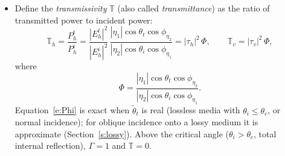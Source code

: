 \documentclass[11pt, oneside]{article}
\begin{document}
\begin{itemize}
\begin{equation}
	\end{equation}
	Similarly,
	\begin{equation}
		\boxed{\Gamma_v = |\rho_v|^2}
	\end{equation}
	\item Define the \emph{transmissivity} $\mathbb{T}$ (also called \emph{transmittance}) as the ratio of transmitted power to incident power:
	\begin{equation}
		\mathbb{T}_h = \frac{P_h^t}{P_h^i} = \frac{|E_h^t|^2}{|E_h^i|^2}\,\frac{|\eta_1|\cos\theta_t\cos\phi_{\eta_2}}{|\eta_2|\cos\theta_i\cos\phi_{\eta_1}} = |\tau_h|^2\,\Phi,
		\qquad
		\mathbb{T}_v = |\tau_v|^2\,\Phi,
	\end{equation}
	where
	\begin{equation}
		\label{e:Phi}
		\Phi = \frac{|\eta_1|\cos\theta_t\cos\phi_{\eta_2}}{|\eta_2|\cos\theta_i\cos\phi_{\eta_1}}.
	\end{equation}
	Equation~\eqref{e:Phi} is exact when $\tilde{\theta}_t$ is real (lossless media with $\theta_i \le \theta_c$, or normal incidence); for oblique incidence onto a lossy medium it is approximate (Section~\ref{s:lossy}). Above the critical angle ($\theta_i > \theta_c$, total internal reflection), $\Gamma = 1$ and $\mathbb{T} = 0$.
\end{itemize}

\end{document}
